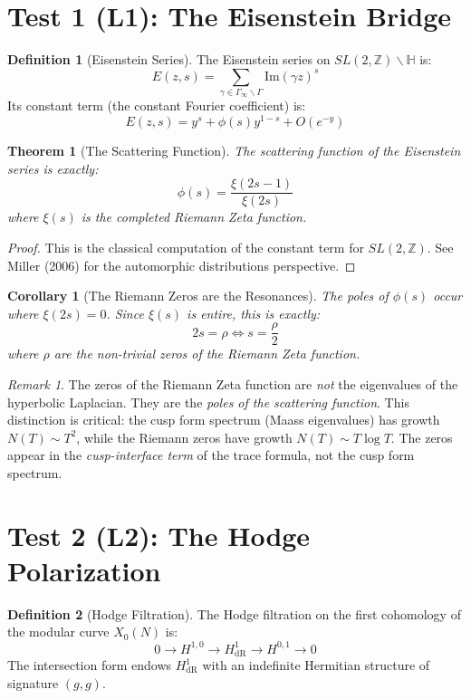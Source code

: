\documentclass[11pt]{article}
\newtheorem{theorem}{Theorem}
\newtheorem{corollary}{Corollary}
\theoremstyle{definition}
\newtheorem{definition}{Definition}
\theoremstyle{remark}
\newtheorem{remark}{Remark}
\begin{document}
\section{Test 1 (L1): The Eisenstein Bridge}

\begin{definition}[Eisenstein Series]
The Eisenstein series on \(SL(2,\mathbb{Z})\backslash\mathbb{H}\) is:
\[ E(z,s) = \sum_{\gamma \in \Gamma_\infty \backslash \Gamma} \text{Im}(\gamma z)^s \]
Its constant term (the constant Fourier coefficient) is:
\[ E(z,s) = y^s + \phi(s) y^{1-s} + O(e^{-y}) \]
\end{definition}

\begin{theorem}[The Scattering Function]
The scattering function of the Eisenstein series is exactly:
\[ \phi(s) = \frac{\xi(2s-1)}{\xi(2s)} \]
where \(\xi(s)\) is the completed Riemann Zeta function.
\end{theorem}

\begin{proof}
This is the classical computation of the constant term for \(SL(2,\mathbb{Z})\). See Miller (2006) for the automorphic distributions perspective.
\end{proof}

\begin{corollary}[The Riemann Zeros are the Resonances]
The poles of \(\phi(s)\) occur where \(\xi(2s) = 0\). Since \(\xi(s)\) is entire, this is exactly:
\[ 2s = \rho \iff s = \frac{\rho}{2} \]
where \(\rho\) are the non-trivial zeros of the Riemann Zeta function.
\end{corollary}

\begin{remark}
The zeros of the Riemann Zeta function are \emph{not} the eigenvalues of the hyperbolic Laplacian. They are the \emph{poles of the scattering function}. This distinction is critical: the cusp form spectrum (Maass eigenvalues) has growth \(N(T) \sim T^2\), while the Riemann zeros have growth \(N(T) \sim T \log T\). The zeros appear in the \emph{cusp-interface term} of the trace formula, not the cusp form spectrum.
\end{remark}

\section{Test 2 (L2): The Hodge Polarization}

\begin{definition}[Hodge Filtration]
The Hodge filtration on the first cohomology of the modular curve \(X_0(N)\) is:
\[ 0 \to H^{1,0} \to H^1_{\text{dR}} \to H^{0,1} \to 0 \]
The intersection form endows \(H^1_{\text{dR}}\) with an indefinite Hermitian structure of signature \((g,g)\).
\end{definition}
\end{document}
